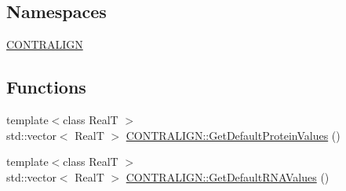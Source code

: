 \subsection*{Namespaces}
\begin{DoxyCompactItemize}
\item 
 \hyperlink{namespace_c_o_n_t_r_a_l_i_g_n}{C\+O\+N\+T\+R\+A\+L\+I\+G\+N}
\end{DoxyCompactItemize}
\subsection*{Functions}
\begin{DoxyCompactItemize}
\item 
{\footnotesize template$<$class Real\+T $>$ }\\std\+::vector$<$ Real\+T $>$ \hyperlink{namespace_c_o_n_t_r_a_l_i_g_n_af16f9793f865b3059ac02c8127cccb62}{C\+O\+N\+T\+R\+A\+L\+I\+G\+N\+::\+Get\+Default\+Protein\+Values} ()
\item 
{\footnotesize template$<$class Real\+T $>$ }\\std\+::vector$<$ Real\+T $>$ \hyperlink{namespace_c_o_n_t_r_a_l_i_g_n_af0f740c7a84dffe3866c40f17e13b5f8}{C\+O\+N\+T\+R\+A\+L\+I\+G\+N\+::\+Get\+Default\+R\+N\+A\+Values} ()
\end{DoxyCompactItemize}
